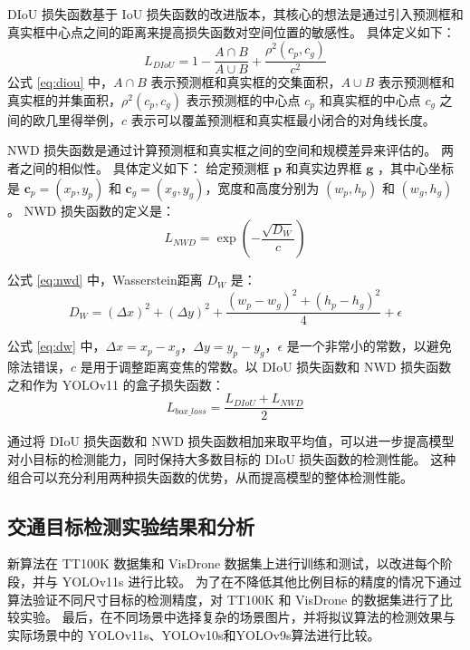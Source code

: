 DIoU 损失函数基于 IoU 损失函数的改进版本，其核心的想法是通过引入预测框和真实框中心点之间的距离来提高损失函数对空间位置的敏感性。
具体定义如下：
\begin{equation}
    \label{eq:diou}
    L_{DIoU} = 1 - \frac{A\cap{B}}{A\cup{B}} + \frac{\rho^2(c_p, c_g)}{c^2}
\end{equation}
公式 \ref{eq:diou} 中，$A\cap{B}$ 表示预测框和真实框的交集面积，$A\cup{B}$ 表示预测框和真实框的并集面积，$\rho^2(c_p, c_g)$ 表示预测框的中心点 $c_p$ 和真实框的中心点 $c_g$ 之间的欧几里得举例，$c$ 表示可以覆盖预测框和真实框最小闭合的对角线长度。

NWD 损失函数是通过计算预测框和真实框之间的空间和规模差异来评估的。 两者之间的相似性。
具体定义如下：
给定预测框 $\mathbf{p}$ 和真实边界框 $\mathbf{g}$ ，其中心坐标是 $\mathbf{c}_p = (x_p, y_p)$ 和 $\mathbf{c}_g = (x_g, y_g)$，宽度和高度分别为 $(w_p, h_p)$ 和 $(w_g, h_g)$。 NWD 损失函数的定义是：
\begin{equation}
    L_{NWD} = \exp\left(-\frac{\sqrt{D_W}}{c}\right)
    \label{eq:nwd}
\end{equation}

公式 \eqref{eq:nwd} 中，Wasserstein距离 $D_W$ 是：
\begin{equation}
    D_W = (\Delta x)^2 + (\Delta y)^2 + \frac{(w_p - w_g)^2 + (h_p - h_g)^2}{4} + \epsilon
    \label{eq:dw}
\end{equation}

公式 \eqref{eq:dw} 中，$\Delta x = x_p - x_g$，$\Delta y = y_p - y_g$，$\epsilon$ 是一个非常小的常数，以避免除法错误，$c$ 是用于调整距离变焦的常数。以 DIoU 损失函数和 NWD 损失函数之和作为 YOLOv11 的盒子损失函数：
\begin{equation}
    L_{box\_loss} = \frac{L_{DIoU}+L_{NWD}}{2}
\end{equation}

通过将 DIoU 损失函数和 NWD 损失函数相加来取平均值，可以进一步提高模型对小目标的检测能力，同时保持大多数目标的 DIoU 损失函数的检测性能。
这种组合可以充分利用两种损失函数的优势，从而提高模型的整体检测性能。


\subsection{交通目标检测实验结果和分析}

新算法在 TT100K 数据集\cite{tt100k}和 VisDrone 数据集\cite{vd}上进行训练和测试，以改进每个阶段，并与 YOLOv11s\cite{yolov11} 进行比较。
为了在不降低其他比例目标的精度的情况下通过算法验证不同尺寸目标的检测精度，对 TT100K 和 VisDrone 的数据集进行了比较实验。
最后，在不同场景中选择复杂的场景图片，并将拟议算法的检测效果与实际场景中的 YOLOv11s、YOLOv10s\cite{yolov10}和YOLOv9s\cite{yolov9}算法进行比较。


